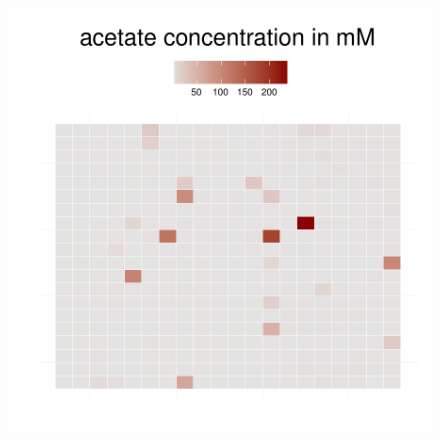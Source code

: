 \begin{figure}[h]
{\begin{minipage}[t]{0.3\textwidth}
  \end{minipage}
  \begin{minipage}[t]{0.3\textwidth}
    \includegraphics[width=\textwidth]{../results/barkeri_ecoli_20x20_seed4612_ace150.pdf}
  \end{minipage}
  }
\end{figure}
